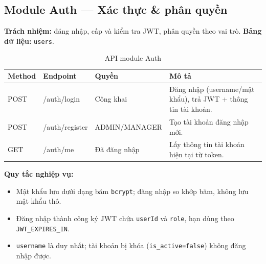 \documentclass[12pt,a4paper]{report}
\begin{document}
\subsection{Module Auth --- Xác thực \& phân quyền}
\textbf{Trách nhiệm:} đăng nhập, cấp và kiểm tra JWT, phân quyền theo vai trò. \textbf{Bảng dữ liệu:} \texttt{users}.
\begin{table}[H]\centering\small
\begin{tabularx}{\textwidth}{|L{1.5cm}|L{3.6cm}|L{3.4cm}|X|}
\hline
\textbf{Method} & \textbf{Endpoint} & \textbf{Quyền} & \textbf{Mô tả} \\ \hline
POST & /auth/login & Công khai & Đăng nhập (username/mật khẩu), trả JWT + thông tin tài khoản. \\ \hline
POST & /auth/register & ADMIN/MANAGER & Tạo tài khoản đăng nhập mới. \\ \hline
GET & /auth/me & Đã đăng nhập & Lấy thông tin tài khoản hiện tại từ token. \\ \hline
\end{tabularx}
\caption{API module Auth}
\end{table}
\textbf{Quy tắc nghiệp vụ:}
\begin{itemize}[leftmargin=1.4cm,nosep]
  \item Mật khẩu lưu dưới dạng băm \texttt{bcrypt}; đăng nhập so khớp băm, không lưu mật khẩu thô.
  \item Đăng nhập thành công ký JWT chứa \texttt{userId} và \texttt{role}, hạn dùng theo \texttt{JWT\_EXPIRES\_IN}.
  \item \texttt{username} là duy nhất; tài khoản bị khóa (\texttt{is\_active=false}) không đăng nhập được.
\end{itemize}
\end{document}
